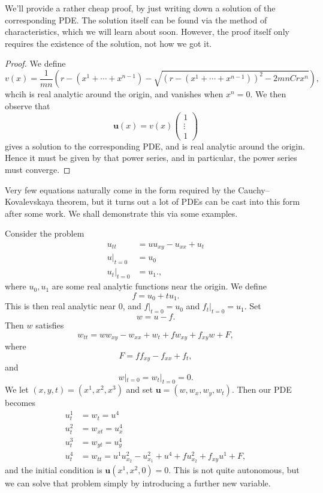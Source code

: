 \documentclass[a4paper]{article}
\begin{document}
We'll provide a rather cheap proof, by just writing down a solution of the corresponding PDE. The solution itself can be found via the method of characteristics, which we will learn about soon. However, the proof itself only requires the existence of the solution, not how we got it.
\begin{proof}
  We define
  \[
    v(x) = \frac{1}{mn} \left(r - (x^1 + \cdots + x^{n - 1}) - \sqrt{(r - (x^1 + \cdots + x^{n - 1}))^2 - 2mn Cr x^n}\right),
  \]
  whcih is real analytic around the origin, and vanishes when $x^n = 0$. We then observe that
  \[
    \mathbf{u}(x) = v(x)
    \begin{pmatrix}
      1\\\vdots\\1
    \end{pmatrix}
  \]
  gives a solution to the corresponding PDE, and is real analytic around the origin. Hence it must be given by that power series, and in particular, the power series must converge.
\end{proof}

%


Very few equations naturally come in the form required by the Cauchy--Kovalevskaya theorem, but it turns out a lot of PDEs can be cast into this form after some work. We shall demonstrate this via some examples.
\begin{eg}
  Consider the problem
  \begin{align*}
    u_{tt} &= uu_{xy} - u_{xx} + u_t\\
    u|_{t = 0} &= u_0\\
    u_t|_{t = 0} &= u_1.,
  \end{align*}
  where $u_0, u_1$ are some real analytic functions near the origin. We define
  \[
    f = u_0 + t u_1.
  \]
  This is then real analytic near $0$, and $f|_{t = 0} = u_0$ and $f_t|_{t = 0} = u_1$. Set
  \[
    w = u - f.
  \]
  Then $w$ satisfies
  \[
    w_{tt} = ww_{xy} - w_{xx} + w_t + f w_{xy} + f_{xy}w + F,
  \]
  where
  \[
    F = ff_{xy} - f_{xx} + f_t,
  \]
  and
  \[
    w|_{t = 0} = w_t|_{t = 0} = 0.
  \]
  We let $(x, y, t) = (x^1, x^2, x^3)$ and set $\mathbf{u} = (w, w_x, w_y, w_t)$. Then our PDE becomes
  \begin{align*}
    u^1_t &= w_t = u^4\\
    u^2_t &= w_{xt} = u^4_x \\
    u^3_t &= w_{yt} = u^4_y\\
    u^4_t &= w_{tt} = u^1 u^2_{x_2} - u^2_{x_1} + u^4 + f u_{x_2}^2 + f_{xy}u^1 + F,
  \end{align*}
  and the initial condition is $\mathbf{u}(x^1, x^2, 0) = 0$. This is not quite autonomous, but we can solve that problem simply by introducing a further new variable.
\end{eg}

\printindex
\end{document}
